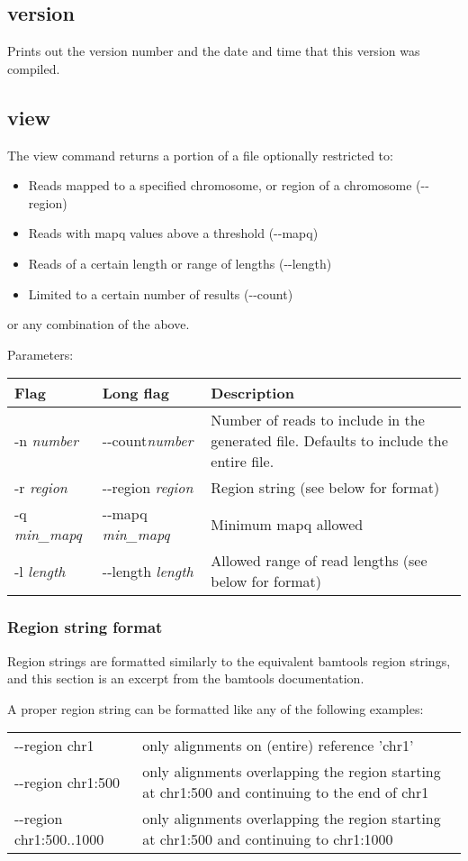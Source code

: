\documentclass[11pt]{article}
\begin{document}
\subsection{version}
Prints out the version number and the date and time that this version was compiled.

\subsection{view}
The view command returns a portion of a file optionally restricted to:
\begin{itemize}
\item Reads mapped to a specified chromosome, or region of a chromosome ({-}{-}region)
\item Reads with mapq values above a threshold ({-}{-}mapq)
\item Reads of a certain length or range of lengths ({-}{-}length)
\item Limited to a certain number of results ({-}{-}count)
\end{itemize}
or any combination of the above.

Parameters:
\begin{center}
\begin{tabular}{llp{3.5in}}
\hline
Flag&Long flag&Description\\ \hline
-n \textit{number}&{-}{-}count\textit{number}&Number of reads to include in the generated file. Defaults to include the entire file.\\
-r \textit{region}&{-}{-}region \textit{region}&Region string (see below for format)\\
-q \textit{min\_mapq}&{-}{-}mapq \textit{min\_mapq}&Minimum mapq allowed\\
-l \textit{length}&{-}{-}length \textit{length}&Allowed range of read lengths (see below for format)\\
\end{tabular}
\end{center}

\subsubsection{Region string format}
Region strings are formatted similarly to the equivalent bamtools region strings, and this section is an excerpt from the bamtools documentation.

A proper region string can be formatted like any of the following examples:

\begin{center}
\begin{tabular}{lp{3.5in}}
{-}{-}region chr1&only alignments on (entire) reference 'chr1'\\
{-}{-}region chr1:500&only alignments overlapping the region starting at chr1:500 and continuing to the end of chr1\\
{-}{-}region chr1:500..1000&only alignments overlapping the region starting at chr1:500 and continuing to chr1:1000\\
\end{tabular}
\end{center}
\end{document}

